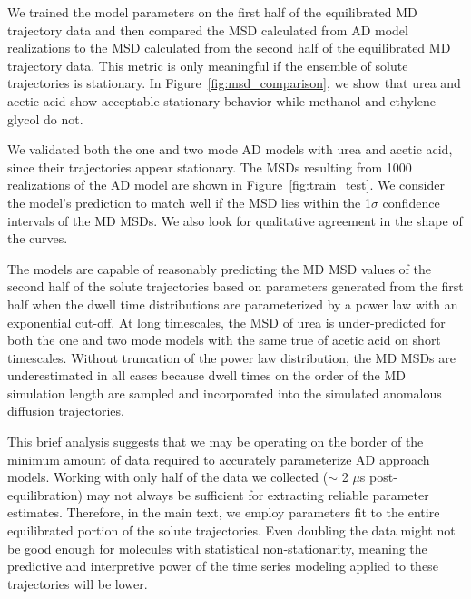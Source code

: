 \documentclass{article}
\begin{document}
  We trained
  the model parameters on the first half of the equilibrated MD trajectory data and
  then compared the MSD calculated from AD model realizations to the MSD calculated
  from the second half of the equilibrated MD trajectory data. This metric is
  only meaningful if the ensemble of solute trajectories is stationary. In 
  Figure~\ref{fig:msd_comparison}, we show that urea and acetic acid show acceptable
  stationary behavior while methanol and ethylene glycol do not.
  
  We validated both the one and two mode AD models with urea and acetic acid, since their
  trajectories appear stationary. The MSDs resulting from 1000 realizations of the AD
  model are shown in Figure~\ref{fig:train_test}. We consider the model's prediction 
  to match well if the MSD lies within the 1$\sigma$ confidence intervals of the MD MSDs.
  We also look for qualitative agreement in the shape of the curves.
  
  The models are capable of reasonably predicting the MD MSD values of the second
  half of the solute trajectories based on parameters generated from the first half
  when the dwell time distributions are parameterized by a power law with an 
  exponential cut-off. At long timescales, the MSD of urea is under-predicted 
  for both the one and two mode models with the same true of acetic acid on short 
  timescales. Without truncation of the power law distribution, the MD 
  MSDs are underestimated in all cases because dwell times on the order of the
  MD simulation length are sampled and incorporated into the simulated anomalous
  diffusion trajectories. 
  
  This brief analysis suggests that we may be operating on the border of the
  minimum amount of data required to accurately parameterize AD approach
  models. Working with only half of the data we collected ($\sim$ 2 $\mu$s
  post-equilibration) may not always be sufficient for extracting reliable
  parameter estimates. Therefore, in the main text, we employ parameters fit
  to the entire equilibrated portion of the solute trajectories. Even doubling
  the data might not be good enough for molecules with statistical 
  non-stationarity, meaning the predictive and interpretive power of the time
  series modeling applied to these trajectories will be lower.
  
\end{document}
